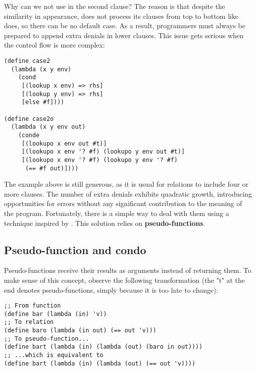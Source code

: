 Why can we not use  in the second clause? The reason is that despite the similarity in appearance,  does not process its clauses from top to bottom like  does, so there can be no default case. As a result, programmers must always be prepared to append extra denials in lower  clauses. This issue gets serious when the control flow is more complex:

\begin{lstlisting}
(define case2
  (lambda (x y env)
    (cond
     [(lookup x env) => rhs]
     [(lookup y env) => rhs]
     [else #f])))

(define case2o
  (lambda (x y env out)
    (conde
     [(lookupo x env out #t)]
     [(lookupo x env '? #f) (lookupo y env out #t)]
     [(lookupo x env '? #f) (lookupo y env '? #f)
      (== #f out)])))
\end{lstlisting}

The example above is still generous, as it is usual for relations to include four or more  clauses. The number of extra denials exhibits quadratic growth, introducing opportunities for errors without any significant contribution to the meaning of the program. Fortunately, there is a simple way to deal with them using a technique inspired by \textcite{reif}. This solution relies on \textbf{pseudo-functions}.

\subsection{Pseudo-function and condo}
Pseudo-functions receive their results as arguments instead of returning them. To make sense of this concept, observe the following transformation (the "t" at the end denotes pseudo-functions, simply because it is too late to change):
\begin{lstlisting}
;; From function
(define bar (lambda (in) 'v))
;; To relation
(define baro (lambda (in out) (== out 'v)))
;; To pseudo-function...
(define bart (lambda (in) (lambda (out) (baro in out))))
;; ...which is equivalent to
(define bart (lambda (in) (lambda (out) (== out 'v))))
\end{lstlisting}

